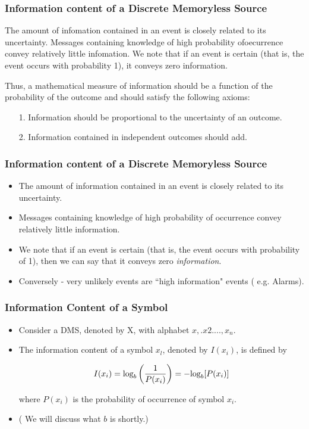 \documentclass[a4]{beamer}
\begin{document}
\begin{frame}
\frametitle{ Information content of a Discrete Memoryless Source}
The amount of infomation contained in an event is closely related to its uncertainty.
Messages containing  knowledge of high probability ofoecurrence convey relatively little infomation. 
We note that if an event is certain (that is, the event occurs with probability 1), it conveys zero information.


Thus, a mathematical measure of information should be a function of the probability of the outcome and should satisfy the following axioms:
\begin{itemize}
\item[1.] Information should be proportional to the uncertainty of an outcome.
\item[2.] Information contained in independent outcomes should add.
\end{itemize}
\end{frame}




\begin{frame}

\frametitle{Information content of a Discrete Memoryless Source}
\begin{itemize}
	\item The amount of information contained in an event is closely related to its uncertainty.
	\item Messages containing knowledge of high probability of occurrence convey relatively little information.
	
	\item We note that if an event is certain (that is, the event occurs with probability of 1), then we can say that it conveys zero \textit{information}.
	
	\item Conversely - very unlikely events are ``high information" events ( e.g. Alarms).
\end{itemize}
\end{frame}


\begin{frame}
\frametitle{Information Content of a Symbol}
\vspace{-1cm}
\begin{itemize}
	\item Consider a DMS, denoted by X, with alphabet ${x,.x2. ...,x_n}$.
	\item The information content of a symbol
	$x_l$, denoted by $I(x_i)$, is defined by
	
	\[  I(x_i)  = \mbox{log}_b\left({1 \over P(x_i)}\right) =  -\mbox{log}_b[ P(x_i) ]  \]
	
	
	where $P(x_i)$ is the probability of occurrence of symbol $x_i$. \item ( We will discuss what $b$ is shortly.)
\end{itemize}
\end{frame}
\end{document}
